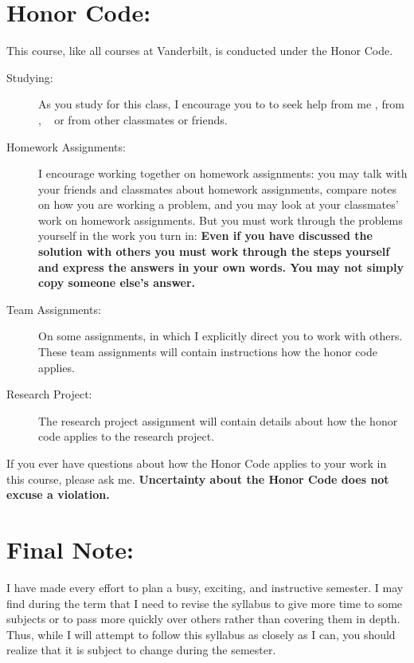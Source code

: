 \documentclass[11pt,twoside]{jgsyllabus}\usepackage[]{graphicx}\usepackage[]{xcolor}
\begin{document}
%
%

\section{Honor Code:}
This course, like all courses at Vanderbilt, is conducted under the Honor Code.
\begin{description}
\item[Studying:] As you study for this class, I encourage you to to seek help from me%
\ifTA
, from \TaTitle,
\else
\
\fi
or from other classmates or friends.

\item[Homework Assignments:] I encourage working together
on homework assignments: you may talk with your friends and classmates about
homework assignments, compare notes on how you are working a problem, and you
may look at your classmates' work on homework assignments.
But you must work through the problems yourself
in the work you turn in:
\textbf{Even if you have discussed the solution with others you must work
through the steps yourself and express the answers in your own words. You may
not simply copy someone else's answer.}

\item[Team Assignments:] On some assignments, in which I explicitly direct you
to work with others.
These team assignments will contain instructions how the honor code applies.

\item[Research Project:] The research project assignment will contain details
about how the honor code applies to the research project.
\end{description}

If you ever
have questions about how the Honor Code applies to your work
in this course, please ask me.
\textbf{Uncertainty about the Honor Code does not excuse a violation.}
\section{Final Note:}
I have made every effort to plan a busy, exciting, and instructive semester.
I may find during the term that I need to revise the syllabus to give more time
to some subjects or to pass more quickly over others rather than covering them
in depth.
Thus, while I will attempt to follow this syllabus as closely as I can,
you should realize that it is subject to change during the semester.
%
%
\iftrue

\fi
%
%
%
%
%
%
%
\end{document}
